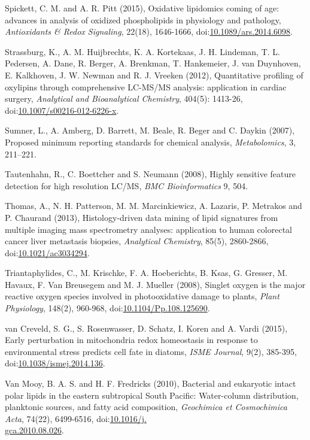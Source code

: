 \begin{singlespace}
{{Spickett, C. M. and A. R. Pitt (2015), Oxidative lipidomics coming of age: advances in analysis of oxidized phospholipids in physiology and pathology, \emph{Antioxidants \& Redox Signaling}, 22(18), 1646-1666, doi:\href{http://dx.doi.org/10.1089/ars.2014.6098}{10.1089/ars.2014.6098}.

Strassburg, K., A. M. Huijbrechts, K. A. Kortekaas, J. H. Lindeman, T. L. Pedersen, A. Dane, R. Berger, A. Brenkman, T. Hankemeier, J. van Duynhoven, E. Kalkhoven, J. W. Newman and R. J. Vreeken (2012), Quantitative profiling of oxylipins through comprehensive LC-MS/MS analysis: application in cardiac surgery, \emph{Analytical and Bioanalytical Chemistry}, 404(5): 1413-26, doi:\href{http://dx.doi.org/10.1007/s00216-012-6226-x}{10.1007/s00216-012-6226-x}.

Sumner, L., A. Amberg, D. Barrett, M. Beale, R. Beger and C. Daykin (2007), Proposed minimum reporting standards for chemical analysis, \emph{Metabolomics}, 3, 211--221.

Tautenhahn, R., C. Boettcher and S. Neumann (2008), Highly sensitive feature detection for high resolution LC/MS, \emph{BMC Bioinformatics} 9, 504.

Thomas, A., N. H. Patterson, M. M. Marcinkiewicz, A. Lazaris, P. Metrakos and P. Chaurand (2013), Histology-driven data mining of lipid signatures from multiple imaging mass spectrometry analyses: application to human colorectal cancer liver metastasis biopsies, \emph{Analytical Chemistry}, 85(5), 2860-2866, doi:\href{http://dx.doi.org/10.1021/ac3034294}{10.1021/ac3034294}.

Triantaphylides, C., M. Krischke, F. A. Hoeberichts, B. Ksas, G. Gresser, M. Havaux, F. Van Breusegem and M. J. Mueller (2008), Singlet oxygen is the major reactive oxygen species involved in photooxidative damage to plants, \emph{Plant Physiology}, 148(2), 960-968, doi:\href{http://dx.doi.org/10.1104/Pp.108.125690}{10.1104/Pp.108.125690}.

van Creveld, S. G., S. Rosenwasser, D. Schatz, I. Koren and A. Vardi (2015), Early perturbation in mitochondria redox homeostasis in response to environmental stress predicts cell fate in diatoms, \emph{ISME Journal}, 9(2), 385-395, doi:\href{http://dx.doi.org/10.1038/ismej.2014.136}{10.1038/ismej.2014.136}.

Van Mooy, B. A. S. and H. F. Fredricks (2010), Bacterial and eukaryotic intact polar lipids in the eastern subtropical South Pacific: Water-column distribution, planktonic sources, and fatty acid composition, \emph{Geochimica et Cosmochimica Acta}, 74(22), 6499-6516, doi:\href{http://dx.doi.org/10.1016/j.gca.2010.08.026}{10.1016/j.\\gca.2010.08.026}.

}}
\end{singlespace}
